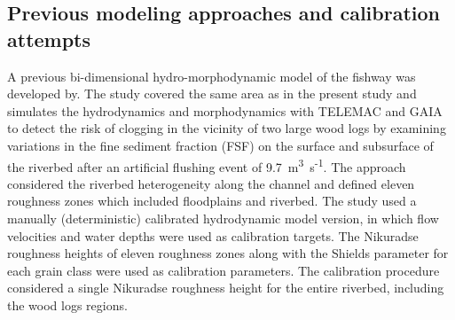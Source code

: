 \subsection{Previous modeling approaches and calibration attempts}
\label{sec:model-setup}

A previous bi-dimensional hydro-morphodynamic model of the fishway was developed by. The study covered the same area as in the present study and simulates the hydrodynamics and morphodynamics with TELEMAC and GAIA to detect the risk of clogging in the vicinity of two large wood logs by examining variations in the fine sediment fraction (FSF) on the surface and subsurface of the riverbed after an artificial flushing event of 9.7~m\textsuperscript{3}~s\textsuperscript{-1}.
The approach considered the riverbed heterogeneity along the channel and defined eleven roughness zones which included floodplains and riverbed. The study used a manually (deterministic) calibrated hydrodynamic model version, in which flow velocities and water depths were used as calibration targets. The Nikuradse roughness heights of eleven roughness zones along with the Shields parameter for each grain class were used as calibration parameters. The calibration procedure considered a single Nikuradse roughness height for the entire riverbed, including the wood logs regions. 



